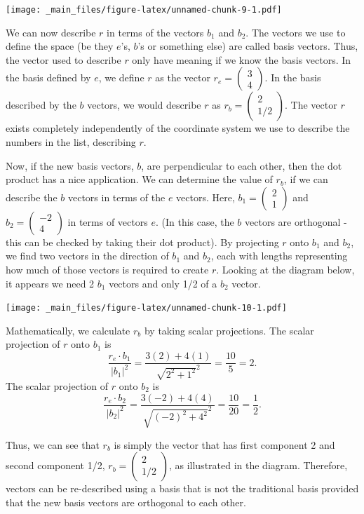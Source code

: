 \documentclass[
]{book}
\theoremstyle{definition}
\theoremstyle{definition}
\theoremstyle{definition}
\theoremstyle{definition}
\theoremstyle{remark}
\begin{document}
\texttt{[image: \_main\_files/figure-latex/unnamed-chunk-9-1.pdf]}

We can now describe \(r\) in terms of the vectors \(b_1\) and \(b_2\). The vectors we use to define the space (be they \(e\)'s, \(b\)'s or something else) are called basis vectors. Thus, the vector used to describe \(r\) only have meaning if we know the basis vectors. In the basis defined by \(e\), we define \(r\) as the vector \(r_e= \begin{pmatrix} 3 \\ 4\end{pmatrix}\). In the basis described by the \(b\) vectors, we would describe \(r\) as \(r_b= \begin{pmatrix} 2 \\ 1/2 \end{pmatrix}\). The vector \(r\) exists completely independently of the coordinate system we use to describe the numbers in the list, describing \(r\).

Now, if the new basis vectors, \(b\), are perpendicular to each other, then the dot product has a nice application. We can determine the value of \(r_b\), if we can describe the \(b\) vectors in terms of the \(e\) vectors. Here, \(b_1 = \begin{pmatrix}2 \\ 1 \end{pmatrix}\) and \(b_2 = \begin{pmatrix} -2\\4\end{pmatrix}\) in terms of vectors \(e\). (In this case, the \(b\) vectors are orthogonal - this can be checked by taking their dot product). By projecting \(r\) onto \(b_1\) and \(b_2\), we find two vectors in the direction of \(b_1\) and \(b_2\), each with lengths representing how much of those vectors is required to create \(r\). Looking at the diagram below, it appears we need 2 \(b_1\) vectors and only 1/2 of a \(b_2\) vector.

\texttt{[image: \_main\_files/figure-latex/unnamed-chunk-10-1.pdf]}

Mathematically, we calculate \(r_b\) by taking scalar projections. The scalar projection of \(r\) onto \(b_1\) is \[\dfrac{r_e \cdot b_1}{|b_1|^2}  = \dfrac{3(2) + 4(1)}{\sqrt{2^2+1^2}^2} = \dfrac{10}{5} = 2.\] The scalar projection of \(r\) onto \(b_2\) is \[\dfrac{r_e \cdot b_2}{|b_2|^2} = \dfrac{3(-2) + 4(4)}{\sqrt{(-2)^2+4^2}^2} = \dfrac{10}{20} = \dfrac{1}{2}.\]

Thus, we can see that \(r_b\) is simply the vector that has first component 2 and second component 1/2, \(r_b = \begin{pmatrix} 2 \\ 1/2 \end{pmatrix}\), as illustrated in the diagram. Therefore, vectors can be re-described using a basis that is not the traditional basis provided that the new basis vectors are orthogonal to each other.
\end{document}
